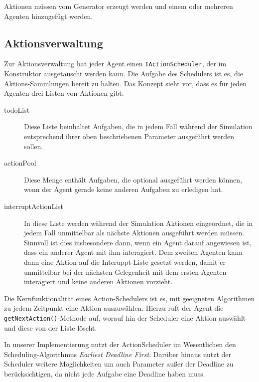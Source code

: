 Aktionen müssen vom Generator erzeugt werden und einem oder mehreren Agenten hinzugefügt werden.

\subsection{Aktionsverwaltung}\label{subsec:concept_actionhandling}
Zur Aktionsverwaltung hat jeder Agent einen \texttt{IActionScheduler}, der im Konstruktor ausgetauscht werden kann. Die Aufgabe des Schedulers ist es, die Aktions-Sammlungen bereit zu halten. Das Konzept sieht vor, dass es für jeden Agenten drei Listen von Aktionen gibt:
\begin{description}
	\item[todoList] Diese Liste beinhaltet Aufgaben, die in jedem Fall während der Simulation entsprechend ihrer oben beschriebenen Parameter ausgeführt werden sollen.
	\item[actionPool] Diese Menge enthält Aufgaben, die optional ausgeführt werden können, wenn der Agent gerade keine anderen Aufgaben zu erledigen hat.
	\item[interruptActionList] In diese Liste werden während der Simulation Aktionen eingeordnet, die in jedem Fall unmittelbar als nächste Aktionen ausgeführt werden müssen. Sinnvoll ist dies insbesondere dann, wenn ein Agent darauf angewiesen ist, dass ein anderer Agent mit ihm interagiert. Dem zweiten Agenten kann dann eine Aktion auf die Interuppt-Liste gesetzt werden, damit er unmittelbar bei der nächsten Gelegenheit mit dem ersten Agenten interagiert und keine anderen Aktionen vorzieht.
\end{description}

Die Kernfunktionalität eines Action-Schedulers ist es, mit geeigneten Algorithmen zu jedem Zeitpunkt eine Aktion auszuwählen. Hierzu ruft der Agent die \texttt{getNextAction()}-Methode auf, worauf hin der Scheduler eine Aktion auswählt und diese von der Liste löscht.

In unserer Implementierung nutzt der ActionScheduler im Wesentlichen den Scheduling-Algorithmus \emph{Earliest Deadline First}. Darüber hinaus nutzt der Scheduler weitere Möglichkeiten um auch Parameter außer der Deadline zu berücksichtigen, da nicht jede Aufgabe eine Deadline haben muss.  


